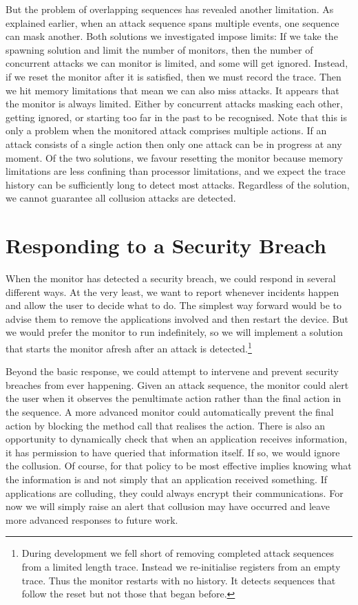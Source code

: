 But the problem of overlapping sequences has revealed another limitation.  As explained earlier, when an attack sequence spans multiple events, one sequence can mask another.  Both solutions we investigated impose limits:  If we take the spawning solution and limit the number of monitors, then the number of concurrent attacks we can monitor is limited, and some will get ignored.  Instead, if we reset the monitor after it is satisfied, then we must record the trace.  Then we hit memory limitations that mean we can also miss attacks.  It appears that the monitor is always limited.  Either by concurrent attacks masking each other, getting ignored, or starting too far in the past to be recognised.  Note that this is only a problem when the monitored attack comprises multiple actions.  If an attack consists of a single action then only one attack can be in progress at any moment.  Of the two solutions, we favour resetting the monitor because memory limitations are less confining than processor limitations, and we expect the trace history can be sufficiently long to detect most attacks.  Regardless of the solution, we cannot guarantee all collusion attacks are detected. 

\section{Responding to a Security Breach}

When the monitor has detected a security breach, we could respond in several different ways.  At the very least, we want to report whenever incidents happen and allow the user to decide what to do.  The simplest way forward would be to advise them to remove the applications involved and then restart the device.  But we would prefer the monitor to run indefinitely, so we will implement a solution that starts the monitor afresh after an attack is detected.\footnote{During development we fell short of removing completed attack sequences from a limited length trace.  Instead we re-initialise registers from an empty trace.  Thus the monitor restarts with no history.  It detects sequences that follow the reset but not those that began before.}

Beyond the basic response, we could attempt to intervene and prevent security breaches from ever happening.  Given an attack sequence, the monitor could alert the user when it observes the penultimate action rather than the final action in the sequence.  A more advanced monitor could automatically prevent the final action by blocking the method call that realises the action.  There is also an opportunity to dynamically check that when an application receives information, it has permission to have queried that information itself.  If so, we would ignore the collusion.  Of course, for that policy to be most effective implies knowing what the information is and not simply that an application received something.  If applications are colluding, they could always encrypt their communications.  For now we will simply raise an alert that collusion may have occurred and leave more advanced responses to future work.

